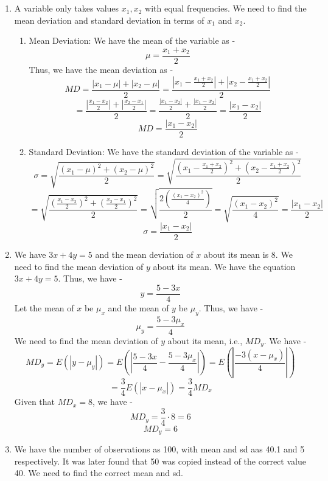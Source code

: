 \chapter{}
\begin{enumerate}
    \item A variable only takes values $x_1, x_2$ with equal frequencies. We need to find the mean deviation and standard deviation in terms of $x_1$ and $x_2$.
    \begin{enumerate}
        \item Mean Deviation:
        We have the mean of the variable as -
        \[\mu = \frac{x_1 + x_2}{2}\]
        Thus, we have the mean deviation as -
        \[MD = \frac{|x_1 - \mu| + |x_2 - \mu|}{2} = \frac{\left|x_1 - \frac{x_1 + x_2}{2}\right| + \left|x_2 - \frac{x_1 + x_2}{2}\right|}{2}\]
        \[= \frac{\left|\frac{x_1 - x_2}{2}\right| + \left|\frac{x_2 - x_1}{2}\right|}{2} = \frac{\frac{|x_1 - x_2|}{2} + \frac{|x_1 - x_2|}{2}}{2} = \frac{|x_1 - x_2|}{2}\]
        \[\boxed{MD = \frac{|x_1 - x_2|}{2}
        }\]
        \item Standard Deviation:
        We have the standard deviation of the variable as -
        \[\sigma = \sqrt{\frac{(x_1 - \mu)^2 + (x_2 - \mu)^2}{2}} = \sqrt{\frac{\left(x_1 - \frac{x_1 + x_2}{2}\right)^2 + \left(x_2 - \frac{x_1 + x_2}{2}\right)^2}{2}}\]
        \[= \sqrt{\frac{\left(\frac{x_1 - x_2}{2}\right)^2 + \left(\frac{x_2 - x_1}{2}\right)^2}{2}} = \sqrt{\frac{2\left(\frac{(x_1 - x_2)^2}{4}\right)}{2}} = \sqrt{\frac{(x_1 - x_2)^2}{4}} = \frac{|x_1 - x_2|}{2}\]
        \[\boxed{\sigma = \frac{|x_1 - x_2|}{2}
        }\]
    \end{enumerate}
    \item We have $3x + 4y = 5$ and the mean deviation of $x$ about its mean is 8. We need to find the mean deviation of $y$ about its mean.
    We have the equation $3x + 4y = 5$. Thus, we have -
    \[y = \frac{5 - 3x}{4}\]
    Let the mean of $x$ be $\mu_x$ and the mean of $y$ be $\mu_y$. Thus, we have -
    \[\mu_y = \frac{5 - 3\mu_x}{4}\]
    We need to find the mean deviation of $y$ about its mean, i.e., $MD_y$. We have -
    \[MD_y = E(|y - \mu_y|) = E\left(\left|\frac{5 - 3x}{4} - \frac{5 - 3\mu_x}{4}\right|\right) = E\left(\left|\frac{-3(x - \mu_x)}{4}\right|\right)\]
    \[= \frac{3}{4} E(|x - \mu_x|) = \frac{3}{4} MD_x\]
    Given that $MD_x = 8$, we have -
    \[MD_y = \frac{3}{4} \cdot 8 = 6\]
    \[\boxed{MD_y = 6
    }\]
    \item We have the number of observations as 100, with mean and sd aas 40.1 and 5 respectively. It was later found that 50 was copied instead of the correct value 40. We need to find the correct mean and sd.

\end{enumerate}
